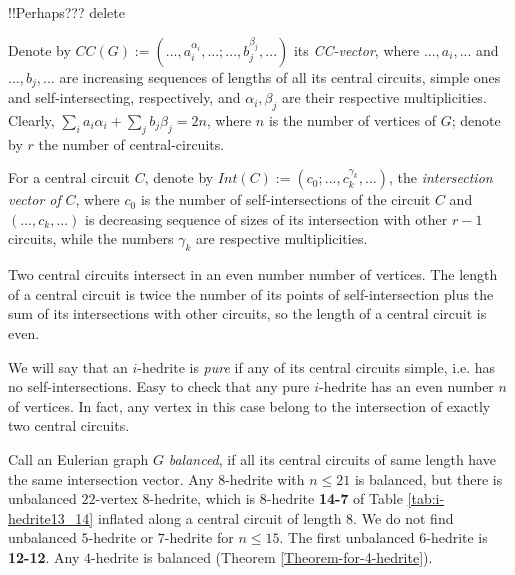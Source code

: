 \documentclass[12pt]{article}
\begin{document}
!!Perhaps??? delete %


Denote by 
$CC(G):=(...,a_i^{\alpha_i},...;...,b_j^{\beta_j},...)$ its {\it CC-vector}, 
where $...,a_i,...$ and  $...,b_j,...$ are increasing sequences of lengths of 
all its central circuits, simple ones and self-intersecting, respectively, 
and $\alpha_i, \beta_j$ are their respective multiplicities.
Clearly, $\sum_{i} a_i{\alpha_i}+ \sum_{j} b_j{\beta_j}=2n$, where 
$n$ is the number of vertices of $G$; denote by $r$ the number of 
central-circuits.


For a central circuit $C$, denote by $Int(C):=(c_0;...,c_k^{\gamma_k},...)$,
the {\em intersection vector of} $C$, where $c_0$ is
the number of self-intersections of the circuit $C$ and $(...,c_k,...)$ is
decreasing sequence of sizes of its intersection with other $r-1$ 
circuits, while the numbers $\gamma_k$ are respective multiplicities.


Two central circuits intersect in an even number number of vertices. 
The length of a central circuit is twice the number of its points of 
self-intersection plus the sum of its intersections with other circuits, 
so the length of a central circuit is even.



We will say that an $i$-hedrite is {\it pure} if any of its central circuits 
simple, i.e. has no self-intersections.
Easy to check that any pure $i$-hedrite has an even number $n$ of 
vertices. In fact, any vertex in this case belong to the intersection 
of exactly two central circuits.


Call an Eulerian graph $G$ {\it balanced}, if all its central circuits of
same length have the same intersection vector.
Any $8$-hedrite with $n \le 21$ is balanced, but there is unbalanced
$22$-vertex $8$-hedrite, which is $8$-hedrite {\bf 14-7} of Table 
\ref{tab:i-hedrite13_14} inflated along a central circuit of length $8$.
We do not find unbalanced $5$-hedrite or $7$-hedrite for $n\leq 15$. The
first unbalanced $6$-hedrite is {\bf 12-12}. Any $4$-hedrite is balanced
(Theorem \ref{Theorem-for-4-hedrite}).
\end{document}
